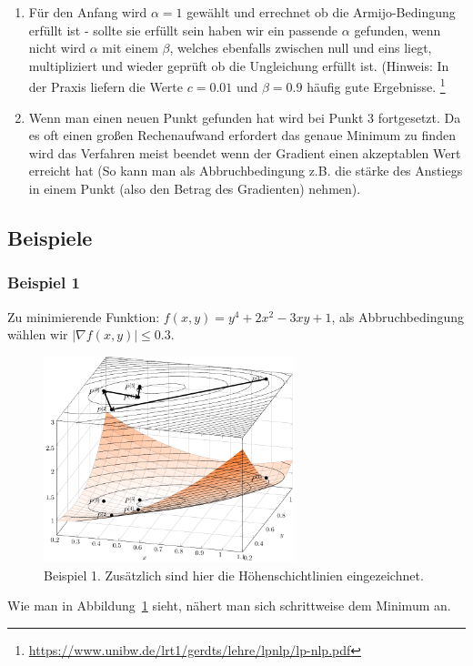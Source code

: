 \documentclass[naustrian]{article}
\begin{document}
{\begin{enumerate}
        $\varphi(\alpha) \leq \varphi(0) + c * \alpha^{[n]} * \varphi(0)'$.
        \\\\ Wobei $c$ eine Konstante zwischen null und eins ist und dazu
        dient das die Bedingung nicht zu restriktiv ist, $\varphi(\alpha) = f(P^{[n]} + \alpha^{[n]}s^{[n]})$
        und $\varphi(0)' = {\nabla}f(P^{n}) * s^{[n]}$
    \item Für den Anfang wird $\alpha=1$ gewählt und errechnet ob die Armijo-Bedingung
        erfüllt ist - sollte sie erfüllt sein haben wir ein passende $\alpha$
        gefunden, wenn nicht wird $\alpha$ mit einem $\beta$, welches ebenfalls
        zwischen null und eins liegt, multipliziert und wieder geprüft ob
        die Ungleichung erfüllt ist. (Hinweis: In der Praxis liefern die Werte
        $c = 0.01$ und $\beta = 0.9$ häufig gute Ergebnisse.
        \footnote{\href{https://www.unibw.de/lrt1/gerdts/lehre/lpnlp/lp-nlp.pdf}{https://www.unibw.de/lrt1/gerdts/lehre/lpnlp/lp-nlp.pdf}}
    \item Wenn man einen neuen Punkt gefunden hat wird bei Punkt 3 fortgesetzt.
        Da es oft einen großen Rechenaufwand erfordert das genaue Minimum
        zu finden wird das Verfahren meist beendet wenn der Gradient einen
        akzeptablen Wert erreicht hat (So kann man als Abbruchbedingung z.B.
        die stärke des Anstiegs in einem Punkt (also den Betrag des Gradienten)
        nehmen).
\end{enumerate}

\subsection{Beispiele}
\subsubsection{Beispiel 1}
Zu minimierende Funktion: $f(x,y)=y^4+2x^2-3xy+1$, als Abbruchbedingung wählen
wir $|{\nabla}f(x,y)| \leq 0.3$.

\begin{figure}[H]
    \centering
    \includegraphics[width=0.65\textwidth]{grad/figure1}
    \caption{Beispiel 1. Zusätzlich sind hier die Höhenschichtlinien eingezeichnet.}
    \label{bsp1}
\end{figure}
Wie man in Abbildung~\ref{bsp1} sieht, nähert man sich schrittweise dem
Minimum an.

}
\end{document}
